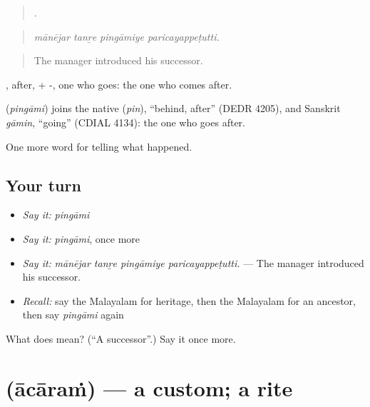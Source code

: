 \begin{quote}
   .
\end{quote}

\begin{quote}
\emph{mānējar tanṟe pingāmiye paricayappeṭutti.}
\end{quote}

\begin{quote}
The manager introduced his successor.
\end{quote}

, after, + -, one who goes: the one who comes after.

\begin{cousinweb}
\textbf{} (\emph{pingāmi}) joins the native  (\emph{pin}), \textquotedblleft{}behind, after\textquotedblright{} (DEDR 4205), and Sanskrit \emph{gāmin}, \textquotedblleft{}going\textquotedblright{} (CDIAL 4134): the one who goes after.
\end{cousinweb}

\begin{grammarlens}[title={What you've built}]
One more word for telling what happened.
\end{grammarlens}

\subsection*{Your turn}
\begin{itemize}
\raggedright
  \item \emph{Say it:} \emph{pingāmi}
  \item \emph{Say it:} \emph{pingāmi}, once more
  \item \emph{Say it:} \emph{mānējar tanṟe pingāmiye paricayappeṭutti.} — The manager introduced his successor.
  \item \emph{Recall:} say the Malayalam for heritage, then the Malayalam for an ancestor, then say \emph{pingāmi} again
\end{itemize}

\begin{tcolorbox}[breakable,colback=teal!4,colframe=teal!35!black,title={Before you move on}]
What does  mean? (\textquotedblleft{}A successor\textquotedblright{}.) Say it once more.
\end{tcolorbox}
\section[\texorpdfstring{\ml{ആചാരം} (ācāraṁ)}{ആചാരം (ācāraṁ)}]{ (ācāraṁ) — a custom; a rite}


